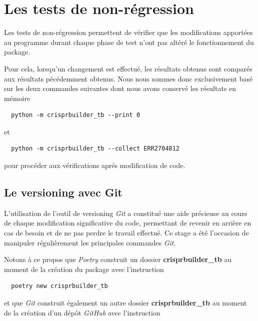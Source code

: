 \documentclass[twoside,a4paper,11pt,frenchb,openany]{report}
\begin{document}
\section{Les tests de non-régression}

Les tests de non-régression permettent de vérifier que les modifications apportées au programme durant chaque phase de test n'ont pas altéré le fonctionnement du package.

Pour cela, lorsqu'un changement est effectué, les résultats obtenus sont comparés aux résultats pécédemment obtenus. Nous nous sommes donc exclusivement basé sur les deux commandes suivantes dont nous avons conservé les résultats en mémoire

\begin{verbatim}  python -m crisprbuilder_tb --print 0\end{verbatim}

et 

\begin{verbatim}  python -m crisprbuilder_tb --collect ERR2704812\end{verbatim}

pour procéder aux vérifications aprés modification de code.



\subsection{Le versioning avec Git}

L'utilisation de l'outil de versioning \textit{Git} a constitué une aide précieuse au cours de chaque modification significative du code, permettant de revenir en arrière en cas de besoin et de ne pas perdre le travail effectué. Ce stage a été l'occasion de manipuler régulièrement les principales commandes \textit{Git}. 

Notons à ce propos que \textit{Poetry} construit un dossier \textbf{crisprbuilder\_tb} au moment de la création du package avec l'instruction

 \begin{verbatim}  poetry new crisprbuilder_tb\end{verbatim}

et que \textit{Git} construit également un autre dossier \textbf{crisprbuilder\_tb} au moment de la création d'un dépôt \textit{GitHub} avec l'instruction
\end{document}
